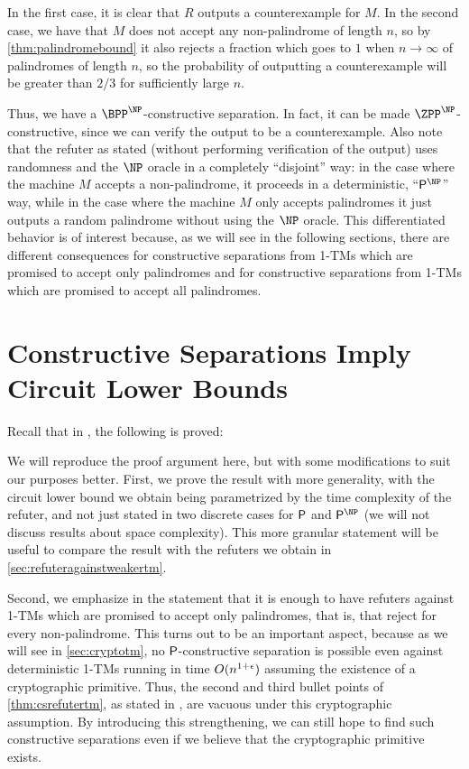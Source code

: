 In the first case, it is clear that $R$ outputs a counterexample for $M$. 
In the second case, we have that $M$ does not accept any non-palindrome of length $n$, so
by \cref{thm:palindromebound} it also rejects a fraction which goes to $1$ when $n \rightarrow \infty$
of palindromes of length $n$, 
so the probability of outputting a counterexample will be greater than $2/3$ for sufficiently large $n$.

Thus, we have a $\BPP^\NP$-constructive separation. In fact, it can be made $\ZPP^\NP$-constructive,
since we can verify the output to be a counterexample.
Also note that the refuter as stated (without performing verification of the output)
uses randomness and the $\NP$ oracle in a completely ``disjoint'' way:
in the case where the machine $M$ accepts a non-palindrome, it proceeds in a deterministic,
``$\PTIME^\NP$'' way, while in the case where the machine $M$ only accepts palindromes
it just outputs a random palindrome without using the $\NP$ oracle.
This differentiated behavior is of interest because, as we will see in the following sections,
there are different consequences for constructive separations from 1-TMs which are promised
to accept only palindromes and for constructive
separations from 1-TMs which are promised to accept all palindromes. 



\section{Constructive Separations Imply Circuit Lower Bounds}

Recall that in \cite{ConstructiveSeparations}, the following is proved:

\thmcsrefutertm*

We will reproduce the proof argument here, but with some modifications to suit our
purposes better. First, we prove the result with more generality, with the circuit lower 
bound we obtain being parametrized by the time complexity of the refuter, and not just
stated in two discrete cases for $\mathsf{P}$ and $\PTIME^\NP$ (we will not discuss results about space complexity). 
This more granular statement will be 
useful to compare the result with the refuters we obtain in \cref{sec:refuteragainstweakertm}.

Second, we emphasize in the statement that it is enough to have refuters against 1-TMs which
are promised to accept only palindromes, that is, that reject for every non-palindrome. 
This turns out to be an important aspect, because as we will see in \cref{sec:cryptotm}, no
$\mathsf{P}$-constructive separation is possible even against deterministic 1-TMs running in time
$O(n^{1+\epsilon})$ assuming the existence of a cryptographic primitive. Thus, the second and third 
bullet points of \cref{thm:csrefutertm}, as stated in \cite{ConstructiveSeparations}, are 
vacuous under this cryptographic assumption. By introducing this strengthening, we can still
hope to find such constructive separations even if we believe that the cryptographic primitive exists. 

